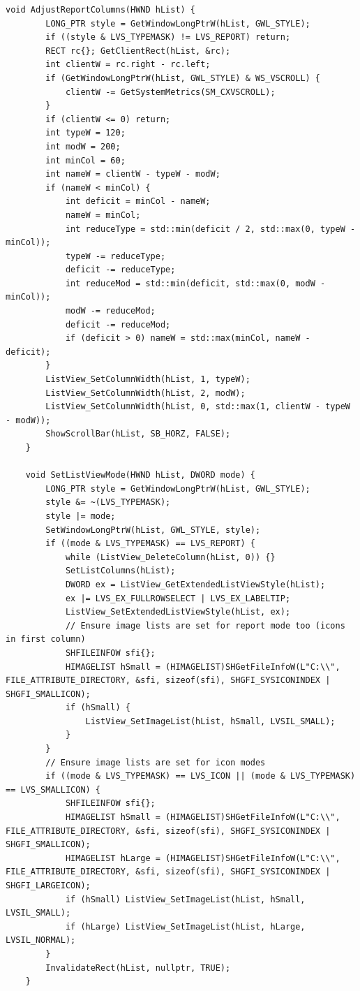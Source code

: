\begin{lstlisting}[style=CodeListing]
    void AdjustReportColumns(HWND hList) {
        LONG_PTR style = GetWindowLongPtrW(hList, GWL_STYLE);
        if ((style & LVS_TYPEMASK) != LVS_REPORT) return;
        RECT rc{}; GetClientRect(hList, &rc);
        int clientW = rc.right - rc.left;
        if (GetWindowLongPtrW(hList, GWL_STYLE) & WS_VSCROLL) {
            clientW -= GetSystemMetrics(SM_CXVSCROLL);
        }
        if (clientW <= 0) return;
        int typeW = 120;
        int modW = 200;
        int minCol = 60;
        int nameW = clientW - typeW - modW;
        if (nameW < minCol) {
            int deficit = minCol - nameW;
            nameW = minCol;
            int reduceType = std::min(deficit / 2, std::max(0, typeW - minCol));
            typeW -= reduceType;
            deficit -= reduceType;
            int reduceMod = std::min(deficit, std::max(0, modW - minCol));
            modW -= reduceMod;
            deficit -= reduceMod;
            if (deficit > 0) nameW = std::max(minCol, nameW - deficit);
        }
        ListView_SetColumnWidth(hList, 1, typeW);
        ListView_SetColumnWidth(hList, 2, modW);
        ListView_SetColumnWidth(hList, 0, std::max(1, clientW - typeW - modW));
        ShowScrollBar(hList, SB_HORZ, FALSE);
    }
    
    void SetListViewMode(HWND hList, DWORD mode) {
        LONG_PTR style = GetWindowLongPtrW(hList, GWL_STYLE);
        style &= ~(LVS_TYPEMASK);
        style |= mode;
        SetWindowLongPtrW(hList, GWL_STYLE, style);
        if ((mode & LVS_TYPEMASK) == LVS_REPORT) {
            while (ListView_DeleteColumn(hList, 0)) {}
            SetListColumns(hList);
            DWORD ex = ListView_GetExtendedListViewStyle(hList);
            ex |= LVS_EX_FULLROWSELECT | LVS_EX_LABELTIP;
            ListView_SetExtendedListViewStyle(hList, ex);
            // Ensure image lists are set for report mode too (icons in first column)
            SHFILEINFOW sfi{};
            HIMAGELIST hSmall = (HIMAGELIST)SHGetFileInfoW(L"C:\\", FILE_ATTRIBUTE_DIRECTORY, &sfi, sizeof(sfi), SHGFI_SYSICONINDEX | SHGFI_SMALLICON);
            if (hSmall) {
                ListView_SetImageList(hList, hSmall, LVSIL_SMALL);
            }
        }
        // Ensure image lists are set for icon modes
        if ((mode & LVS_TYPEMASK) == LVS_ICON || (mode & LVS_TYPEMASK) == LVS_SMALLICON) {
            SHFILEINFOW sfi{};
            HIMAGELIST hSmall = (HIMAGELIST)SHGetFileInfoW(L"C:\\", FILE_ATTRIBUTE_DIRECTORY, &sfi, sizeof(sfi), SHGFI_SYSICONINDEX | SHGFI_SMALLICON);
            HIMAGELIST hLarge = (HIMAGELIST)SHGetFileInfoW(L"C:\\", FILE_ATTRIBUTE_DIRECTORY, &sfi, sizeof(sfi), SHGFI_SYSICONINDEX | SHGFI_LARGEICON);
            if (hSmall) ListView_SetImageList(hList, hSmall, LVSIL_SMALL);
            if (hLarge) ListView_SetImageList(hList, hLarge, LVSIL_NORMAL);
        }
        InvalidateRect(hList, nullptr, TRUE);
    }
    

\end{lstlisting}
